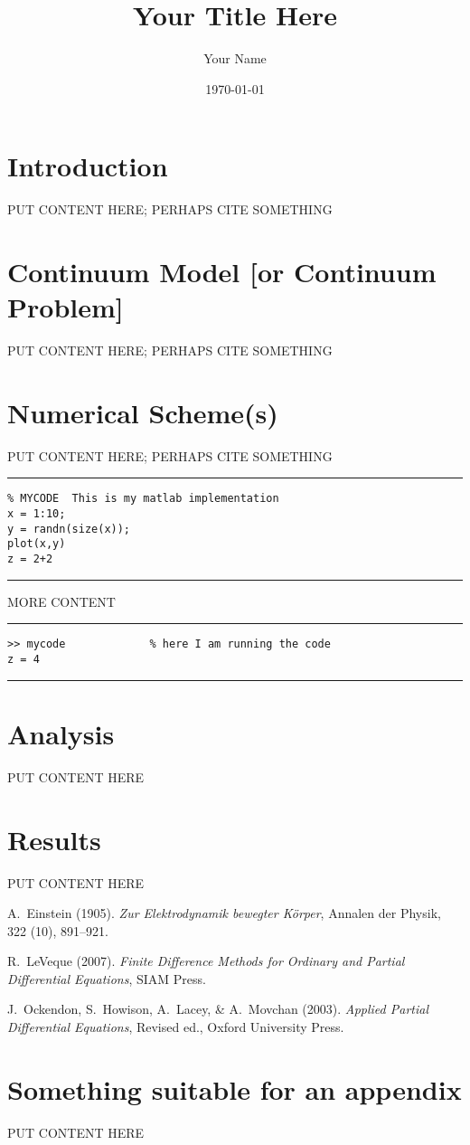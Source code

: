 \documentclass[11pt]{article}
\begin{document}
\title{Your Title Here}

\author{Your Name}

\date{\today}

\maketitle

\section{Introduction}  PUT CONTENT HERE; PERHAPS CITE SOMETHING \cite{einstein}


\section{Continuum Model [or Continuum Problem]}  PUT CONTENT HERE; PERHAPS CITE SOMETHING \cite{ockendonetal}

\section{Numerical Scheme(s)}  PUT CONTENT HERE; PERHAPS CITE SOMETHING \cite{leveque}

\bigskip
\hrule
\begin{verbatim}
% MYCODE  This is my matlab implementation
x = 1:10;
y = randn(size(x));
plot(x,y)
z = 2+2
\end{verbatim}
\hrule
\bigskip

MORE CONTENT

\bigskip
\hrule
\begin{verbatim}
>> mycode             % here I am running the code
z = 4
\end{verbatim}
\hrule

\section{Analysis}  PUT CONTENT HERE

\section{Results}  PUT CONTENT HERE

\begin{thebibliography}{2}  %

A.~Einstein (1905). 
\textit{Zur Elektrodynamik bewegter K{\"o}rper},
Annalen der Physik, 322 (10), 891--921.

R.~LeVeque (2007).
\textit{Finite Difference Methods for Ordinary and Partial Differential Equations},
SIAM Press.

J.~Ockendon, S.~Howison, A.~Lacey, \& A.~Movchan (2003).
\textit{Applied Partial Differential Equations},
Revised ed., Oxford University Press.

\end{thebibliography}

\appendix
\section{Something suitable for an appendix}  PUT CONTENT HERE
\end{document}
